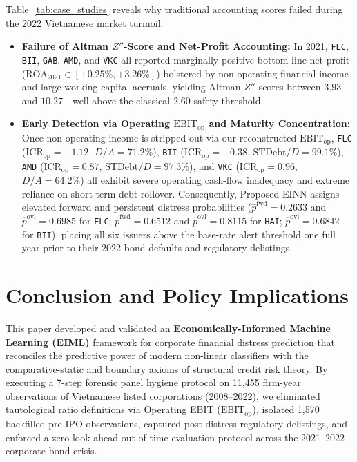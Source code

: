 \documentclass[11pt,a4paper]{article}
\begin{document}
Table~\ref{tab:case_studies} reveals why traditional accounting scores failed during the 2022 Vietnamese market turmoil:
\begin{itemize}
    \item \textbf{Failure of Altman $Z''$-Score and Net-Profit Accounting:} In 2021, \texttt{FLC}, \texttt{BII}, \texttt{GAB}, \texttt{AMD}, and \texttt{VKC} all reported marginally positive bottom-line net profit ($\text{ROA}_{2021} \in [+0.25\%, +3.26\%]$) bolstered by non-operating financial income and large working-capital accruals, yielding Altman $Z''$-scores between $3.93$ and $10.27$---well above the classical $2.60$ safety threshold.
    \item \textbf{Early Detection via Operating $\text{EBIT}_{\text{op}}$ and Maturity Concentration:} Once non-operating income is stripped out via our reconstructed $\text{EBIT}_{\text{op}}$, \texttt{FLC} ($\text{ICR}_{\text{op}} = -1.12$, $D/A = 71.2\%$), \texttt{BII} ($\text{ICR}_{\text{op}} = -0.38$, $\text{STDebt}/D = 99.1\%$), \texttt{AMD} ($\text{ICR}_{\text{op}} = 0.87$, $\text{STDebt}/D = 97.3\%$), and \texttt{VKC} ($\text{ICR}_{\text{op}} = 0.96$, $D/A = 64.2\%$) all exhibit severe operating cash-flow inadequacy and extreme reliance on short-term debt rollover. Consequently, Proposed EINN assigns elevated forward and persistent distress probabilities ($\hat{p}^{\text{fwd}} = 0.2633$ and $\hat{p}^{\text{ovl}} = 0.6985$ for \texttt{FLC}; $\hat{p}^{\text{fwd}} = 0.6512$ and $\hat{p}^{\text{ovl}} = 0.8115$ for \texttt{HAI}; $\hat{p}^{\text{ovl}} = 0.6842$ for \texttt{BII}), placing all six issuers above the base-rate alert threshold one full year prior to their 2022 bond defaults and regulatory delistings.
\end{itemize}

\section{Conclusion and Policy Implications}
\label{sec:conclusion}

This paper developed and validated an \textbf{Economically-Informed Machine Learning (EIML)} framework for corporate financial distress prediction that reconciles the predictive power of modern non-linear classifiers with the comparative-static and boundary axioms of structural credit risk theory. By executing a 7-step forensic panel hygiene protocol on 11,455 firm-year observations of Vietnamese listed corporations (2008--2022), we eliminated tautological ratio definitions via Operating EBIT ($\text{EBIT}_{\text{op}}$), isolated 1,570 backfilled pre-IPO observations, captured post-distress regulatory delistings, and enforced a zero-look-ahead out-of-time evaluation protocol across the 2021--2022 corporate bond crisis.
\end{document}
